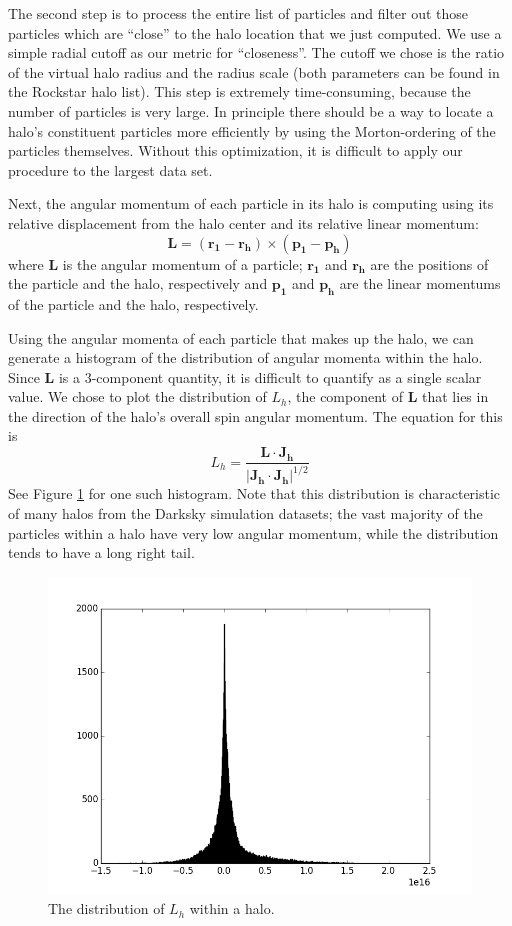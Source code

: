 \documentclass[12pt]{article}
\renewcommand{\vec}[1]{\mathbf{#1}}
\begin{document}
The second step is to process the entire list of particles and filter out those
particles which are ``close'' to the halo location that we just computed.  We
use a simple radial cutoff as our metric for ``closeness''. The cutoff we chose
is the ratio of the virtual halo radius and the radius scale (both parameters
can be found in the Rockstar halo list). This step is extremely time-consuming,
because the number of particles is very large.  In principle there should be
a way to locate a halo's constituent particles more efficiently by using the
Morton-ordering of the particles themselves. Without this optimization, it is
difficult to apply our procedure to the largest data set.

Next, the angular momentum of each particle in its halo is computing using
its relative displacement from the halo center and its relative linear
momentum:
\begin{equation}
\vec{L} = (\vec{r_1} - \vec{r_h}) \times (\vec{p_1} - \vec{p_h})
\end{equation}
where $\vec{L}$ is the angular momentum of a particle; $\vec{r_1}$ and $\vec{r_h}$ are
the positions of the particle and the halo, respectively and $\vec{p_1}$ and $\vec{p_h}$ 
are the linear momentums of the particle and the halo, respectively.

Using the angular momenta of each particle that makes up the halo, we can
generate a histogram of the distribution of angular momenta within the halo.
Since $\vec{L}$ is a 3-component quantity, it is difficult to quantify as
a single scalar value. We chose to plot the distribution of $L_h$, the
component of $\vec{L}$ that lies in the direction of the halo's overall spin
angular momentum. The equation for this is
\begin{equation}
L_h = \frac{\vec{L} \cdot \vec{J_h}}{|\vec{J_h} \cdot \vec{J_h}|^{1/2}}
\end{equation}
See Figure \ref{fig:actual_hist} for one such histogram. Note that this
distribution is characteristic of many halos from the Darksky simulation
datasets; the vast majority of the particles within a halo have very low
angular momentum, while the distribution tends to have a long right tail.

\begin{figure}[htp]
\centering
\includegraphics[width=0.5\columnwidth]{../figures/actual_angmom_histogram.png}
\caption{The distribution of $L_h$ within a halo.}
\label{fig:actual_hist}
\end{figure}
\end{document}
